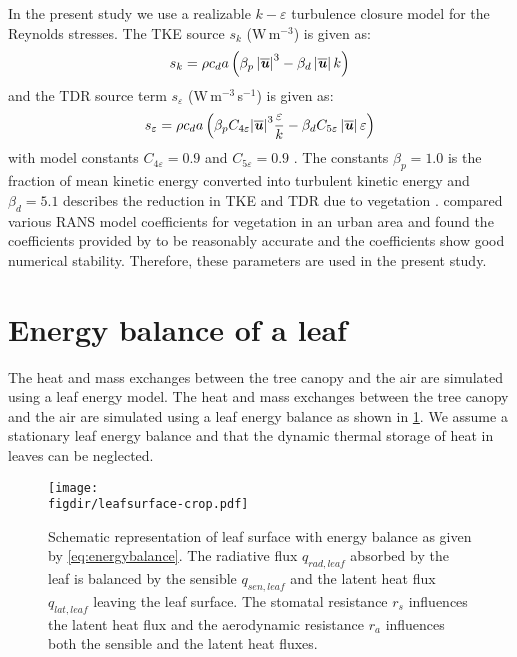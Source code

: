 In the present study we use a realizable $k-\varepsilon$ turbulence closure model for the Reynolds stresses. The TKE source $s_k$ (W\,m$^{-3}$) is given as: 
 	\begin{equation}
 	s_k = \rho {c_d}a\left( \beta _p \left| \overline{\textbf{\textit{u}}} \right|^3 - \beta _d\left| \overline{\textbf{\textit{u}}} \right|k \right)
	\label{eq:source_k}		 	
 	\end{equation}
and the TDR source term $s_{\varepsilon}$ (W\,m$^{-3}$\,s$^{-1}$) is given as:
	\begin{equation}
	s_\varepsilon = \rho {c_d}a\left( {{\beta _p}{C_{4\varepsilon }}{{\left| \overline{\textbf{\textit{u}}} \right|}^3}\frac{\varepsilon }{k} - {\beta _d}{C_{5\varepsilon }}\left| \overline{\textbf{\textit{u}}} \right|\varepsilon } \right)
	\label{eq:source_eps}		 	
	\end{equation}
with model constants $C_{4\varepsilon}=0.9$ and $C_{5\varepsilon}=0.9$ \citep{Katul2004, Kenjeres2013, Sanz2003}. The constants $\beta_p=1.0$ is the fraction of mean kinetic energy converted into turbulent kinetic energy and $\beta_d=5.1$ describes the reduction in TKE and TDR due to vegetation \citep{Sanz2003}. \cite{Kenjeres2013} compared various RANS model coefficients for vegetation in an urban area and found the coefficients provided by \cite{Katul2004} to be reasonably accurate and the coefficients show good numerical stability. Therefore, these parameters are used in the present study.

\section{Energy balance of a leaf}
\label{sec:leafenergy}

The heat and mass exchanges between the tree canopy and the air are simulated using a leaf energy model. The heat and mass exchanges between the tree canopy and the air are simulated using a leaf energy balance as shown in \cref{fig:leaf_energybalance}. We assume a stationary leaf energy balance and that the dynamic thermal storage of heat in leaves can be neglected. 

	\begin{figure}[h]
	\centering
	\texttt{[image: \\figdir/leafsurface-crop.pdf]}
	\caption{Schematic representation of leaf surface with energy balance as given by \cref{eq:energybalance}. The radiative flux $q_{\mathit{rad,leaf}}$  absorbed by the leaf is balanced by the sensible $q_{\mathit{sen,leaf}}$ and the latent heat flux $q_{\mathit{lat,leaf}}$ leaving the leaf surface. The stomatal resistance 
	$r_s$ influences the latent heat flux and the aerodynamic resistance $r_a$ influences both the sensible and the latent heat fluxes. }
	\label{fig:leaf_energybalance}
	\end{figure}

